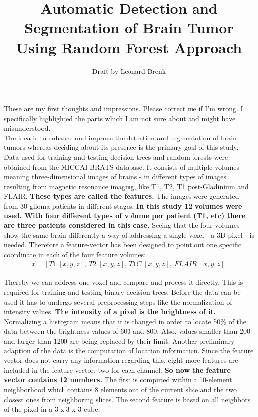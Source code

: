 \documentclass{article}
\title{Automatic Detection and Segmentation of Brain Tumor Using Random Forest Approach}
\author{Draft by Leonard Brenk}
\begin{document}
 \maketitle
 These are my first thoughts and impressions. Please correct me if I'm wrong. I specifically highlighted the parts which I am not sure about and might have misunderstood.\\

 The idea is to enhance and improve the detection and segmentation of brain tumors whereas deciding about its presence is the primary goal of this study. Data used for training and testing decision trees and random forests were obtained from the MICCAI BRATS database. It consists of multiple volumes - meaning three-dimensional images of brains - in different types of images resulting from magnetic resonance imaging, like T1, T2, T1 post-Gladinium and FLAIR. \textbf{These types are called the features.} The images were generated from 30 glioma patients in different stages. \textbf{In this study 12 volumes were used. With four different types of volume per patient (T1, etc) there are three patients considered in this case.} Seeing that the four volumes show the same brain differently a way of addressing a single voxel - a 3D-pixel - is needed. Therefore a feature-vector has been designed to point out one specific coordinate in each of the four feature volumes:\\
 \[ \vec{x} = \bigg[ \: T1\; [x,y,z], \: T2\; [x,y,z], \: T1C\; [x,y,z],\: FLAIR\; [x,y,z] \bigg] \]\\
 Thereby we can address one voxel and compare and process it directly. This is required for training and testing binary decision trees. Before the data can be used it has to undergo several preprocessing steps like the normalization of intensity values. \textbf{The intensity of a pixel is the brightness of it.} Normalizing a histogram means that it is changed in order to locate 50\% of the data between the brightness values of 600 and 800. Also, values smaller than 200 and larger than 1200 are being replaced by their limit. Another preliminary adaption of the data is the computation of location information. Since the feature vector does not carry any information regarding this, eight more features are included in the feature vector, two for each channel. \textbf{So now the feature vector contains 12 numbers.} The first is computed within a 10-element neighborhood which contains 8 elements out of the current slice and the two closest ones from neighboring slices. The second feature is based on all neighbors of the pixel in a 3 x 3 x 3 cube.\\
\end{document}
